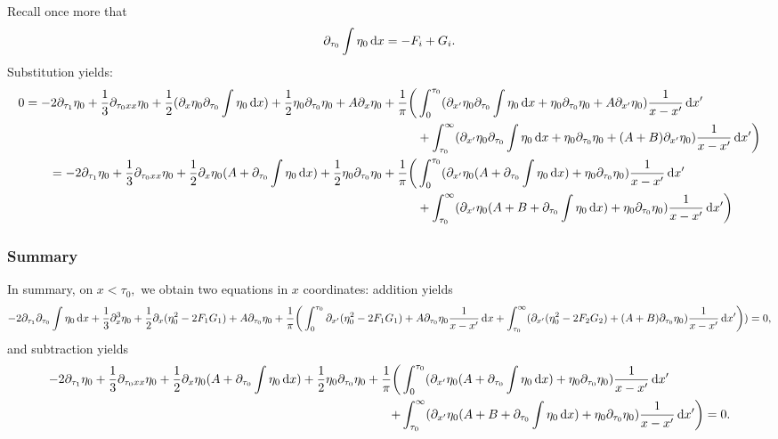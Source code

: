 \documentclass[10pt,reqno,oneside,a4paper, landscape]{article}
\begin{document}
Recall once more that 
\[ 
\partial_{\tau_0} \int \eta_0 \,\mathrm{d} x = - F_i + G_i.
\]
Substitution yields:
\begin{align*}
0 = - 2 \partial_{\tau_1} \eta_0 +  \frac{1}{3}\partial_{\tau_0 xx}\eta_0 + \frac{1}{2}( \partial_{x} \eta_0 \partial_{\tau_0} \int \eta_0 \,\mathrm{d} x) + \frac{1}{2} \eta_0 \partial_{\tau_0}\eta_0 + A\partial_x \eta_0 +  \frac{1}{\pi} \bigg(
&\int^{\tau_0}_{0} ( \partial_{x'} \eta_0 \partial_{\tau_0} \int \eta_0 \,\mathrm{d} x + \eta_0 \partial_{\tau_0}\eta_0  + A\partial_{x'} \eta_0 ) \frac{1}{x-x'} \,\mathrm{d} x' \\
&+ \int^{\infty}_{\tau_0} ( \partial_{x'} \eta_0 \partial_{\tau_0} \int \eta_0 \,\mathrm{d} x + \eta_0 \partial_{\tau_0}\eta_0 + (A+B) \partial_{x'}\eta_0)\frac{1}{x -x'} \,\mathrm{d} x' \bigg) \\
=- 2 \partial_{\tau_1} \eta_0 +  \frac{1}{3}\partial_{\tau_0 xx}\eta_0 + \frac{1}{2} \partial_{x} \eta_0 (A+ \partial_{\tau_0} \int \eta_0 \,\mathrm{d} x) + \frac{1}{2} \eta_0 \partial_{\tau_0}\eta_0 +  \frac{1}{\pi} \bigg(
&\int^{\tau_0}_{0} ( \partial_{x'} \eta_0 (A+ \partial_{\tau_0} \int \eta_0 \,\mathrm{d} x) + \eta_0 \partial_{\tau_0}\eta_0) \frac{1}{x-x'} \,\mathrm{d} x' \\
&+ \int^{\infty}_{\tau_0} ( \partial_{x'} \eta_0 (A+B+ \partial_{\tau_0} \int \eta_0 \,\mathrm{d} x) + \eta_0 \partial_{\tau_0}\eta_0)\frac{1}{x -x'} \,\mathrm{d} x' \bigg)
 \end{align*}
 
\subsubsection*{Summary}
In summary, on $x< \tau_0,$ we obtain two equations in $x$ coordinates: addition yields
\[ 
- 2 \partial_{\tau_1} \partial_{\tau_0} \int \eta_0 \,\mathrm{d} x + \frac{1}{3} \partial_x^3 \eta_0+ \frac{1}{2} \partial_x( \eta_0^2 - 2 F_1 G_1 )  +A \partial_{\tau_0} \eta_0 + \frac{1}{\pi} \bigg(\int_0^{\tau_0} \partial_{x'}( \eta_0^2 - 2 F_1 G_1 ) + A\partial_{\tau_0} \eta_0 \frac{1}{x -x'} \,\mathrm{d} x + \int^{\infty}_{\tau_0} ( \partial_{x'}(\eta_0^2 - 2 F_2 G_2) + (A+B) \partial_{\tau_0}\eta_0 )\frac{1}{x -x'} \,\mathrm{d} x' \bigg))  = 0,
\]
and subtraction yields
\begin{align*}
- 2 \partial_{\tau_1} \eta_0 +  \frac{1}{3}\partial_{\tau_0 xx}\eta_0 + \frac{1}{2} \partial_{x} \eta_0 (A+ \partial_{\tau_0} \int \eta_0 \,\mathrm{d} x) + \frac{1}{2} \eta_0 \partial_{\tau_0}\eta_0 +  \frac{1}{\pi} \bigg(&\int^{\tau_0}_{0} ( \partial_{x'} \eta_0 (A+ \partial_{\tau_0} \int \eta_0 \,\mathrm{d} x) + \eta_0 \partial_{\tau_0}\eta_0) \frac{1}{x-x'} \,\mathrm{d} x'  \\
+ &\int^{\infty}_{\tau_0} ( \partial_{x'} \eta_0 (A+B+ \partial_{\tau_0} \int \eta_0 \,\mathrm{d} x) + \eta_0 \partial_{\tau_0}\eta_0)\frac{1}{x -x'} \,\mathrm{d} x' \bigg)=0.
\end{align*}
\end{document}
